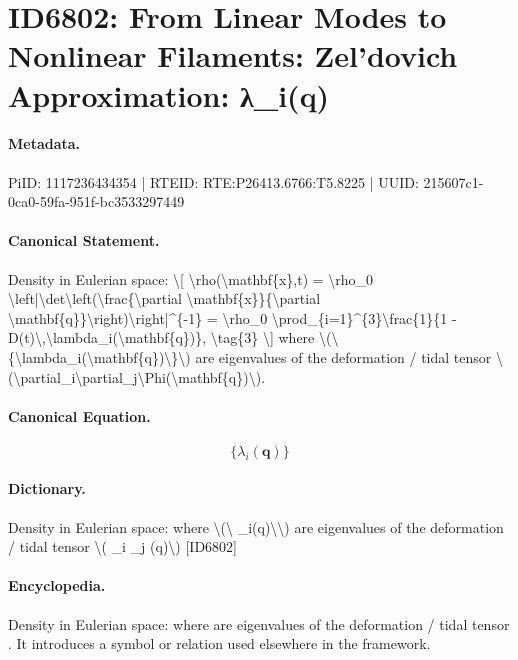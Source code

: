 \section*{ID6802: From Linear Modes to Nonlinear Filaments: Zel’dovich Approximation: λ\_i(q)}
\paragraph{Metadata.}
PiID: 1117236434354 | RTEID: RTE:P26413.6766:T5.8225 | UUID: 215607c1-0ca0-59fa-951f-bc3533297449

\paragraph{Canonical Statement.}
Density in Eulerian space: \textbackslash{}[ \textbackslash{}rho(\textbackslash{}mathbf\{x\},t) = \textbackslash{}rho\_0 \textbackslash{}left|\textbackslash{}det\textbackslash{}left(\textbackslash{}frac\{\textbackslash{}partial \textbackslash{}mathbf\{x\}\}\{\textbackslash{}partial \textbackslash{}mathbf\{q\}\}\textbackslash{}right)\textbackslash{}right|\textasciicircum{}\{-1\} = \textbackslash{}rho\_0 \textbackslash{}prod\_\{i=1\}\textasciicircum{}\{3\}\textbackslash{}frac\{1\}\{1 - D(t)\textbackslash{},\textbackslash{}lambda\_i(\textbackslash{}mathbf\{q\})\}, \textbackslash{}tag\{3\} \textbackslash{}] where \textbackslash{}(\textbackslash{}\{\textbackslash{}lambda\_i(\textbackslash{}mathbf\{q\})\textbackslash{}\}\textbackslash{}) are eigenvalues of the deformation / tidal tensor \textbackslash{}(\textbackslash{}partial\_i\textbackslash{}partial\_j\textbackslash{}Phi(\textbackslash{}mathbf\{q\})\textbackslash{}).

\paragraph{Canonical Equation.}
\[
\{\lambda_i(\mathbf{q})\}
\]

\paragraph{Dictionary.}
Density in Eulerian space: where \textbackslash{}(\textbackslash{} \_i(q)\textbackslash{}\textbackslash{}) are eigenvalues of the deformation / tidal tensor \textbackslash{}( \_i \_j (q)\textbackslash{}) [ID6802]

\paragraph{Encyclopedia.}
Density in Eulerian space: where are eigenvalues of the deformation / tidal tensor . It introduces a symbol or relation used elsewhere in the framework.
